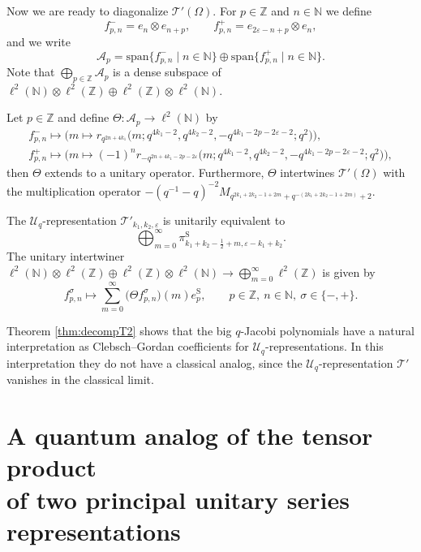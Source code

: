 \documentclass[pdftex]{sigma}
\numberwithin{equation}{section}
\numberwithin{theorem}{section}
\numberwithin{proposition}{section}
\numberwithin{lemma}{section}
\numberwithin{corollary}{section}
\numberwithin{definition}{section}
\numberwithin{example}{section}
\numberwithin{remark}{section}
\numberwithin{note}{section}
\newcommand{\N}{\mathbb N}
\newcommand{\Z}{\mathbb Z}
\newcommand{\eps}{\varepsilon}
\newcommand{\U}{\mathcal U}
\begin{document}
Now we are ready to diagonalize $\mathcal T'(\Omega)$. For $p \in \Z$ and $n \in \N$ we def\/ine
\[
f_{p,n}^- = e_{n} \otimes e_{n+p}, \qquad f_{p,n}^+ = e_{2\eps-n+p} \otimes e_n,
\]
and we write
\[
\mathcal A_p = \mathrm{span}\{f_{p,n}^- \mid n \in \N\} \oplus \mathrm{span}\{ f_{p,n}^+ \mid n \in \N\}.
\]
Note that $\bigoplus_{p \in \Z} \mathcal A_p$ is a dense subspace of $\ell^2(\N)\otimes \ell^2(\Z) \oplus \ell^2(\Z)\otimes \ell^2(\N)$.

\begin{proposition} \label{prop:Te2}
Let $p \in \Z$ and define $\Theta:\mathcal A_p \to \ell^2(\N)$ by
\begin{gather*}
f_{p,n}^-   \mapsto \big(m \mapsto r_{q^{2n+4k_1}}\big(m;q^{4k_1-2},q^{4k_2-2}, -q^{4k_1-2p-2\eps-2};q^2\big)\big),\\
f_{p,n}^+  \mapsto \big(m \mapsto (-1)^n r_{-q^{2n+4k_1-2p-2\eps}}\big(m;q^{4k_1-2},q^{4k_2-2}, -q^{4k_1-2p-2\eps-2};q^2\big)\big),
\end{gather*}
then $\Theta$ extends to a unitary operator. Furthermore, $\Theta$ intertwines $\mathcal T'(\Omega)$ with the multiplication operator $-(q^{-1}-q)^{-2} M_{q^{2k_1+2k_2-1+2m}+q^{-(2k_1+2k_2-1+2m)}+2}$.
\end{proposition}

\begin{theorem} \label{thm:decompT2}
The $\U_q$-representation $\mathcal T'_{k_1,k_2,\eps}$ is unitarily equivalent to
\[
\bigoplus_{m=0}^\infty \pi^{\mathrm S}_{k_1+k_2-\frac12+m,\eps-k_1+k_2}.
\]
The unitary intertwiner $\ell^2(\N)\otimes \ell^2(\Z) \oplus \ell^2(\Z)\otimes \ell^2(\N) \to \bigoplus_{m=0}^\infty \ell^2(\Z)$ is given by
\[
f_{p,n}^\sigma \mapsto \sum_{m=0}^\infty \big(\Theta f_{p,n}^\sigma\big)(m)  e_p^{\mathrm S}, \qquad p \in \Z, \ n \in \N, \ \sigma \in \{-,+\}.
\]
\end{theorem}

\begin{remark}
Theorem \ref{thm:decompT2} shows that the big $q$-Jacobi polynomials have a natural interpretation as Clebsch--Gordan coef\/f\/icients for $\U_q$-representations. In this interpretation they do not have a classical analog, since the $\U_q$-representation $\mathcal T'$ vanishes in the classical limit.
\end{remark}



\section{A quantum analog of the tensor product\\ of two principal unitary series representations} \label{sec:PP}
\end{document}
